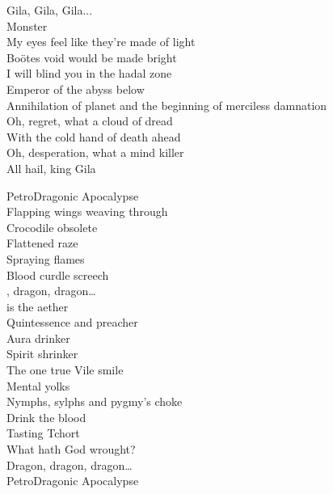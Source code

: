Gila, Gila, Gila...\\
Monster\\

My eyes feel like they're made of light\\
Boötes void would be made bright\\
I will blind you in the hadal zone\\
Emperor of the abyss below\\

Annihilation of planet  and the beginning of merciless damnation\\

Oh, regret, what a cloud of dread\\
With the cold hand of death ahead\\
Oh, desperation, what a mind killer\\
All hail, king Gila\\



PetroDragonic Apocalypse\\

Flapping wings weaving through\\
Crocodile obsolete\\
Flattened raze\\
Spraying flames\\
Blood curdle screech\\

, dragon, dragon…\\

 is the aether\\
Quintessence and preacher\\
Aura drinker\\
Spirit shrinker\\
The one true 
Vile smile\\
Mental yolks\\
Nymphs, sylphs and pygmy's choke\\
Drink the blood\\
Tasting Tchort\\
What hath God wrought?\\

Dragon, dragon, dragon…\\

PetroDragonic Apocalypse\\

